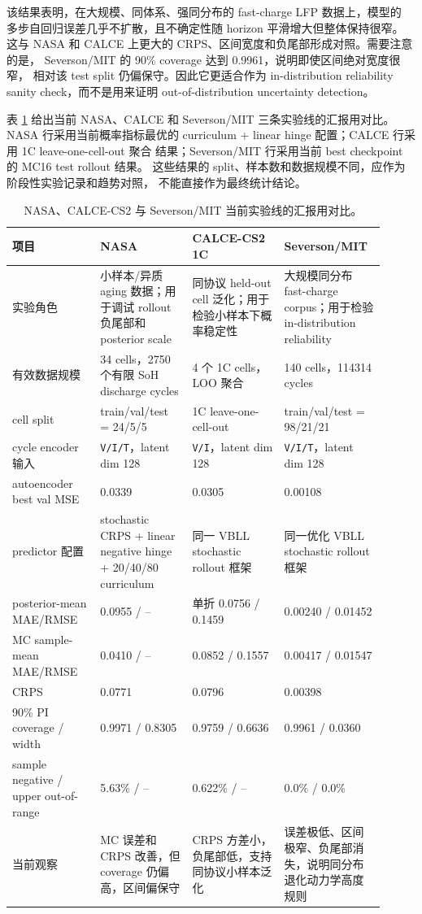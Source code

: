 \documentclass[11pt,a4paper,fontset=none]{ctexart}
\begin{document}
该结果表明，在大规模、同体系、强同分布的 fast-charge LFP 数据上，模型的
多步自回归误差几乎不扩散，且不确定性随 horizon 平滑增大但整体保持很窄。
这与 NASA 和 CALCE 上更大的 CRPS、区间宽度和负尾部形成对照。需要注意的是，
Severson/MIT 的 90\% coverage 达到 0.9961，说明即使区间绝对宽度很窄，
相对该 test split 仍偏保守。因此它更适合作为 in-distribution reliability
sanity check，而不是用来证明 out-of-distribution uncertainty detection。

表 \ref{tab:nasa_calce_severson_summary} 给出当前 NASA、CALCE 和
Severson/MIT 三条实验线的汇报用对比。NASA 行采用当前概率指标最优的
curriculum + linear hinge 配置；CALCE 行采用 1C leave-one-cell-out 聚合
结果；Severson/MIT 行采用当前 best checkpoint 的 MC16 test rollout 结果。
这些结果的 split、样本数和数据规模不同，应作为阶段性实验记录和趋势对照，
不能直接作为最终统计结论。

\begin{table}[h]
\centering
\scriptsize
\setlength{\tabcolsep}{2pt}
\begin{tabular}{p{0.22\linewidth}p{0.23\linewidth}p{0.23\linewidth}p{0.23\linewidth}}
\toprule
项目 & NASA & CALCE-CS2 1C & Severson/MIT \\
\midrule
实验角色 & 小样本/异质 aging 数据；用于调试 rollout 负尾部和 posterior scale & 同协议 held-out cell 泛化；用于检验小样本下概率稳定性 & 大规模同分布 fast-charge corpus；用于检验 in-distribution reliability \\
有效数据规模 & 34 cells，2750 个有限 SoH discharge cycles & 4 个 1C cells，LOO 聚合 & 140 cells，114314 cycles \\
cell split & train/val/test = 24/5/5 & 1C leave-one-cell-out & train/val/test = 98/21/21 \\
cycle encoder 输入 & \texttt{V/I/T}，latent dim 128 & \texttt{V/I}，latent dim 128 & \texttt{V/I/T}，latent dim 128 \\
autoencoder best val MSE & 0.0339 & 0.0305 & 0.00108 \\
predictor 配置 & stochastic CRPS + linear negative hinge + 20/40/80 curriculum & 同一 VBLL stochastic rollout 框架 & 同一优化 VBLL stochastic rollout 框架 \\
posterior-mean MAE/RMSE & 0.0955 / -- & 单折 0.0756 / 0.1459 & 0.00240 / 0.01452 \\
MC sample-mean MAE/RMSE & 0.0410 / -- & 0.0852 / 0.1557 & 0.00417 / 0.01547 \\
CRPS & 0.0771 & 0.0796 & 0.00398 \\
90\% PI coverage / width & 0.9971 / 0.8305 & 0.9759 / 0.6636 & 0.9961 / 0.0360 \\
sample negative / upper out-of-range & 5.63\% / -- & 0.622\% / -- & 0.0\% / 0.0\% \\
当前观察 & MC 误差和 CRPS 改善，但 coverage 仍偏高，区间偏保守 & CRPS 方差小，负尾部低，支持同协议小样本泛化 & 误差极低、区间极窄、负尾部消失，说明同分布退化动力学高度规则 \\
\bottomrule
\end{tabular}
\caption{NASA、CALCE-CS2 与 Severson/MIT 当前实验线的汇报用对比。}
\label{tab:nasa_calce_severson_summary}
\end{table}
\end{document}
